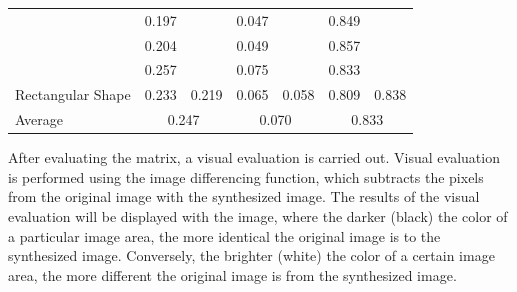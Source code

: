\documentclass[conference]{IEEEtran}
\begin{document}
\begin{table}[]
\begin{tabular}{|l|cc|cc|cc|}
                                                      & \multicolumn{1}{c|}{\cellcolor[HTML]{FFFFFF}0.197} & \cellcolor[HTML]{FFFFFF}                         & \multicolumn{1}{c|}{\cellcolor[HTML]{FFFFFF}0.047} & \cellcolor[HTML]{FFFFFF}                           & \multicolumn{1}{c|}{\cellcolor[HTML]{FFFFFF}0.849} & \cellcolor[HTML]{FFFFFF}                        \\ \cline{2-2} \cline{4-4} \cline{6-6}
                                                      & \multicolumn{1}{c|}{\cellcolor[HTML]{FFFFFF}0.204} & \cellcolor[HTML]{FFFFFF}                         & \multicolumn{1}{c|}{\cellcolor[HTML]{FFFFFF}0.049}  & \cellcolor[HTML]{FFFFFF}                           & \multicolumn{1}{c|}{\cellcolor[HTML]{FFFFFF}0.857} & \cellcolor[HTML]{FFFFFF}                        \\ \cline{2-2} \cline{4-4} \cline{6-6}
                                                      & \multicolumn{1}{c|}{\cellcolor[HTML]{FFFFFF}0.257} & \cellcolor[HTML]{FFFFFF}                         & \multicolumn{1}{c|}{\cellcolor[HTML]{FFFFFF}0.075} & \cellcolor[HTML]{FFFFFF}                           & \multicolumn{1}{c|}{\cellcolor[HTML]{FFFFFF}0.833} & \cellcolor[HTML]{FFFFFF}                        \\ \cline{2-2} \cline{4-4} \cline{6-6}
  \multirow{-5}{*}{Rectangular Shape}  & \multicolumn{1}{c|}{\cellcolor[HTML]{FFFFFF}0.233} & \multirow{-5}{*}{\cellcolor[HTML]{FFFFFF}0.219} & \multicolumn{1}{c|}{\cellcolor[HTML]{FFFFFF}0.065} & \multirow{-5}{*}{\cellcolor[HTML]{FFFFFF}0.058} & \multicolumn{1}{c|}{\cellcolor[HTML]{FFFFFF}0.809} & \multirow{-5}{*}{\cellcolor[HTML]{FFFFFF}0.838} \\ \hline
  Average                                           & \multicolumn{2}{c|}{\cellcolor[HTML]{FFFFFF}0.247}                                                    & \multicolumn{2}{c|}{0.070}                                                                              & \multicolumn{2}{c|}{0.833}                                                                           \\ \hline
  \end{tabular}
\end{table}

After evaluating the matrix, a visual evaluation is carried out.
Visual evaluation is performed using the image differencing function, which subtracts the pixels from the original image with the synthesized image.
The results of the visual evaluation will be displayed with the image, where the darker (black) the color of a particular image area, the more identical the original image is to the synthesized image.
Conversely, the brighter (white) the color of a certain image area, the more different the original image is from the synthesized image.
\end{document}
